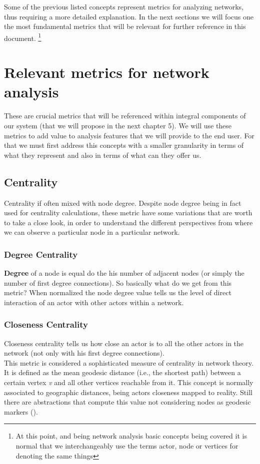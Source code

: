 Some of the previous listed concepts represent metrics for analyzing networks, thus requiring a more detailed explanation. In the next sections we will focus one the most fundamental metrics that will be relevant for further reference in this document. \footnote{At this point, and being network analysis basic concepts being covered it is normal that we interchangeably use the terms actor, node or vertices for denoting the same things}

\section{Relevant metrics for network analysis}
These are crucial metrics that will be referenced within integral components of our system (that we will propose in the next chapter 5). We will use these metrics to add value to analysis features that we will provide to the end user. For that we must first address this concepts with a smaller granularity in terms of
what they represent and also in terms of what can they offer us.

\subsection{Centrality}
Centrality if often mixed with node degree. Despite node degree being in fact used for centrality calculations, these metric have some variations
that are worth to take a close look, in order to understand the different perspectives from where we can observe a particular node in a particular network.

\subsubsection*{Degree Centrality}
\textbf{Degree} of a node is equal do the his number of adjacent nodes (or simply the number of first degree connections).
So basically what do we get from this metric? When normalized the node degree value tells us the level of direct interaction of an actor with other
actors within a network.

\subsubsection*{Closeness Centrality}
Closeness centrality tells us how close an actor is to all the other actors in the network (not only with his first degree connections).\\
\indent This metric is considered a sophisticated measure of centrality in network theory. It is defined as the mean geodesic distance
(i.e., the shortest path) between a certain vertex \textit{v} and all other vertices reachable from it. This concept is normally associated to
geographic distances, being actors closeness mapped to reality. Still there are abstractions that compute
this value not considering nodes as geodesic markers (\cite{politaktivsna}).


